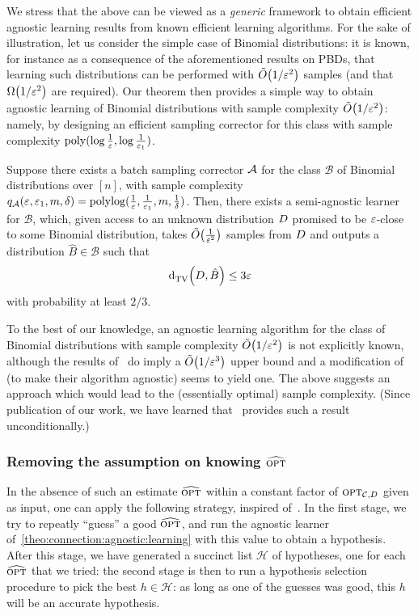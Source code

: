 We stress that the above can be viewed as a \emph{generic} framework to obtain efficient agnostic learning results from known efficient learning algorithms.
For the sake of illustration, let us consider the simple case of Binomial distributions: it is known, for instance as a consequence of the aforementioned results on PBDs, that learning such distributions can be performed with $\tildeO{1/\eps^2}$ samples (and that $\bigOmega{1/\eps^2}$ are required). Our theorem then provides a simple way to obtain agnostic learning of Binomial distributions with sample complexity $\tildeO{1/\eps^2}$: namely, by designing  an efficient sampling corrector for this class with sample complexity $\operatorname*{poly}(\log\frac{1}{\varepsilon},\log\frac{1}{\varepsilon_1})$.


\begin{corollary}
Suppose there exists a batch sampling corrector $\mathcal{A}$ for the class $\mathcal{B}$ of Binomial distributions over $[n]$, with sample complexity $q_\mathcal{A}(\varepsilon,\varepsilon_1,m,\delta)=\operatorname*{poly}\!\log(\frac{1}{\varepsilon},\frac{1}{\varepsilon_1},m,\frac{1}{\delta})$.
Then, there exists a semi-agnostic learner for $\mathcal{B}$, which, given access to an unknown distribution $D$ promised to be $\varepsilon$-close to some Binomial distribution, takes $\tildeO{\frac{1}{\eps^2}}$ samples from $D$ and outputs a distribution $\hat{B}\in\mathcal{B}$ such that
\[
  {\operatorname{d}_{\textrm{TV}}^{}\!\left({D, \hat{B}}\right)} \leq 3\varepsilon
\]
with probability at least $2/3$.
\end{corollary}
\noindent To the best of our knowledge, an agnostic learning algorithm for the class of Binomial distributions with sample complexity $\tildeO{1/\eps^2}$ is not explicitly known, although the results of~\cite{CDSS:14} do imply a $\tildeO{1/\eps^3}$ upper bound and a modification of~\cite{DDS:PBD:12} (to make their algorithm agnostic) seems to yield one. The above suggests an approach which would lead to the (essentially optimal) sample complexity. (Since publication of our work, we have learned that~\cite{ADLS:15} provides such a result unconditionally.)

\subsubsection{Removing the assumption on knowing \texorpdfstring{$\widehat{{\textsc{opt}}}$}{an estimate of \opt}}

In the absence of such an estimate $\widehat{{\textsc{opt}}}$ within a constant factor of ${\textsc{opt}}_{\mathcal{C}, D}$ given as input, one can apply the following strategy, inspired of~\cite[Theorem 6]{CDSS:14:NIPS}. In the first stage, we try to repeatly ``guess'' a good $\widehat{{\textsc{opt}}}$, and run the agnostic learner of~\autoref{theo:connection:agnostic:learning} with this value to obtain a hypothesis. After this stage, we have generated a succinct list $\mathcal{H}$ of hypotheses, one for each $\widehat{{\textsc{opt}}}$ that we tried: the second stage is then to run a hypothesis selection procedure to pick the best $h\in\mathcal{H}$: as long as one of the guesses was good, this $h$ will be an accurate hypothesis.

